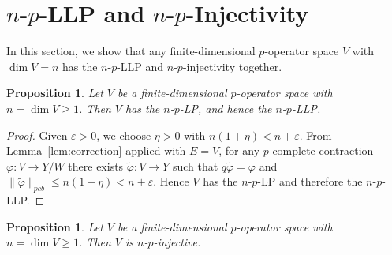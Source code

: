 \documentclass[12pt]{article}
\newtheorem{proposition}[theorem]{Proposition}
\newcommand{\pcb}{pcb}
\begin{document}
\section{$n$-$p$-LLP and $n$-$p$-Injectivity}

In this section, we show that any finite-dimensional $p$-operator space $V$ with $\dim V=n$ has the $n$-$p$-LLP and $n$-$p$-injectivity together.


\begin{proposition}\label{prop:fd-equivalence}
Let $V$ be a finite-dimensional $p$-operator space with $n=\dim V\geq 1$.
Then $V$ has the $n$-$p$-LP, and hence the $n$-$p$-LLP.
\end{proposition}

\begin{proof}
 Given $\varepsilon>0$, we choose $\eta>0$ with
$n(1+\eta)<n+\varepsilon$.  From Lemma~\ref{lem:correction} applied with $E=V$, for any
$p$-complete contraction $\varphi:V\to Y/W$ there exists $\widetilde\varphi:V\to Y$
such that $q\widetilde\varphi=\varphi$ and
$\|\widetilde\varphi\|_{\pcb}\leq n(1+\eta)<n+\varepsilon$.  Hence $V$ has the $n$-$p$-LP and therefore the $n$-$p$-LLP.
\end{proof}





\begin{proposition}\label{prop:fd-injective}
Let $V$ be a finite-dimensional $p$-operator space with $n=\dim V\geq 1$.
Then $V$ is $n$-$p$-injective.
\end{proposition}
\end{document}
